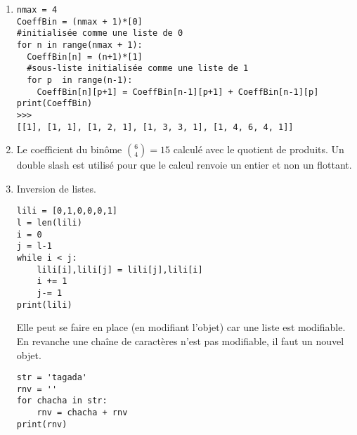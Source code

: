 \begin{enumerate}
  \item 
 
\begin{verbatim}
nmax = 4
CoeffBin = (nmax + 1)*[0]
#initialisée comme une liste de 0
for n in range(nmax + 1):
  CoeffBin[n] = (n+1)*[1]
  #sous-liste initialisée comme une liste de 1
  for p  in range(n-1):
    CoeffBin[n][p+1] = CoeffBin[n-1][p+1] + CoeffBin[n-1][p]  
print(CoeffBin)
>>> 
[[1], [1, 1], [1, 2, 1], [1, 3, 3, 1], [1, 4, 6, 4, 1]]\end{verbatim}

  \item Le coefficient du binôme $\binom{6}{4}=15$ calculé avec le quotient de produits. Un double slash est utilisé pour que le calcul renvoie un entier et non un flottant.

  \item Inversion de listes.
\begin{verbatim}lili = [0,1,0,0,0,1]
l = len(lili)
i = 0
j = l-1
while i < j:
    lili[i],lili[j] = lili[j],lili[i]
    i += 1
    j-= 1
print(lili)\end{verbatim}
Elle peut se faire en place (en modifiant l'objet) car une liste est modifiable.\newline
En revanche une chaîne de caractères n'est pas modifiable, il faut un nouvel objet.
\begin{verbatim}str = 'tagada'
rnv = ''
for chacha in str:
    rnv = chacha + rnv
print(rnv)\end{verbatim}

\end{enumerate}
